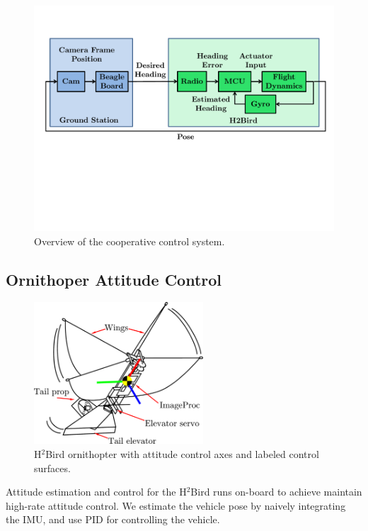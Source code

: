 \documentclass{aamas2013}
\begin{document}
\begin{figure}[tb]
\centering
\includegraphics[width=\linewidth]{figures/process_flow.pdf}
\caption{Overview of the cooperative control system.}
\label{fig:process_flow}
\end{figure}

\subsection{Ornithoper Attitude Control}

\begin{figure}[!tb]
\centering
\includegraphics[height=150pt]{figures/h2bird_axes.pdf}
\caption{H$^2$Bird ornithopter with attitude control axes and labeled control surfaces.}
\label{fig:h2Bird_axes}
\end{figure}

Attitude estimation and control for the H$^2$Bird runs on-board to achieve 
maintain high-rate attitude control. We estimate the vehicle pose by naively
integrating the IMU, and use PID for controlling the vehicle.
\end{document}
